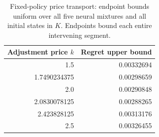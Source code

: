 \begin{table}[htbp]\centering
\caption{Fixed-policy price transport: endpoint bounds uniform over all five neural mixtures and all initial states in $K$. Endpoints bound each entire intervening segment.}
\begin{tabular}{rr}\toprule
Adjustment price $k$ & Regret upper bound \\ \midrule
1.5 & 0.00332694 \\
1.7490234375 & 0.00298659 \\
2.0 & 0.00290848 \\
2.0830078125 & 0.00288265 \\
2.423828125 & 0.00313176 \\
2.5 & 0.00326455 \\
\bottomrule\end{tabular}
\end{table}
